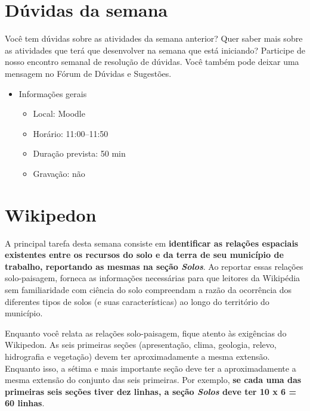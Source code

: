 \documentclass[
  11pt,
  a4paper,
  dvipsnames]{tufte-book}
\providecommand{\tightlist}{%
  \setlength{\itemsep}{0pt}\setlength{\parskip}{0pt}}
\begin{document}
\hypertarget{duxfavidas-da-semana-10}{%
\section{Dúvidas da semana}\label{duxfavidas-da-semana-10}}

Você tem dúvidas sobre as atividades da semana anterior? Quer saber mais sobre as atividades que terá que desenvolver na semana que está iniciando? Participe de nosso encontro semanal de resolução de dúvidas. Você também pode deixar uma mensagem no Fórum de Dúvidas e Sugestões.

\begin{itemize}
\tightlist
\item
  Informações gerais

  \begin{itemize}
  \tightlist
  \item
    Local: Moodle
  \item
    Horário: 11:00--11:50
  \item
    Duração prevista: 50 min
  \item
    Gravação: não
  \end{itemize}
\end{itemize}

\hypertarget{wikipedon-8}{%
\section{Wikipedon}\label{wikipedon-8}}

A principal tarefa desta semana consiste em \textbf{identificar as relações espaciais existentes entre os recursos do solo e da terra de seu município de trabalho, reportando as mesmas na seção \emph{Solos}}. Ao reportar essas relações solo-paisagem, forneca as informações necessárias para que leitores da Wikipédia sem familiaridade com ciência do solo compreendam a razão da ocorrência dos diferentes tipos de solos (e suas características) ao longo do território do município.

Enquanto você relata as relações solo-paisagem, fique atento às exigências do Wikipedon. As seis primeiras seções (apresentação, clima, geologia, relevo, hidrografia e vegetação) devem ter aproximadamente a mesma extensão. Enquanto isso, a sétima e mais importante seção deve ter a aproximadamente a mesma extensão do conjunto das seis primeiras. Por exemplo, \textbf{se cada uma das primeiras seis seções tiver dez linhas, a seção \emph{Solos} deve ter 10 x 6 = 60 linhas}.
\end{document}
